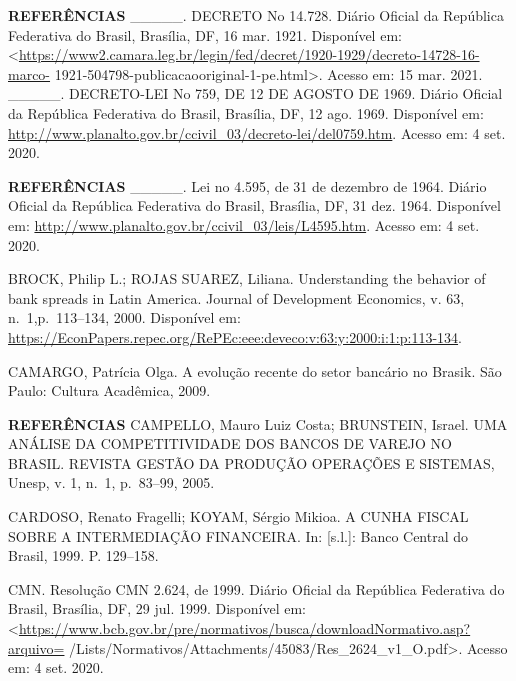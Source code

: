 \documentclass[
  ignorenonframetext,
  aspectratio=169,
  ignorenonframetext]{beamer}
\begin{document}
\begin{frame}{\textbf{REFERÊNCIAS}}
\protect\hypertarget{referuxeancias-6}{}
\_\_\_\_\_. DECRETO No 14.728. Diário Oficial da República Federativa do
Brasil, Brasília, DF, 16 mar. 1921. Disponível em:
\textless{}\url{https://www2.camara.leg.br/legin/fed/decret/1920-1929/decreto-14728-16-marco-}
1921-504798-publicacaooriginal-1-pe.html\textgreater. Acesso em: 15 mar.
2021. \_\_\_\_\_. DECRETO-LEI No 759, DE 12 DE AGOSTO DE 1969. Diário
Oficial da República Federativa do Brasil, Brasília, DF, 12 ago. 1969.
Disponível em:
\url{http://www.planalto.gov.br/ccivil_03/decreto-lei/del0759.htm}.
Acesso em: 4 set. 2020.
\end{frame}

\begin{frame}{\textbf{REFERÊNCIAS}}
\protect\hypertarget{referuxeancias-7}{}
\_\_\_\_\_. Lei no 4.595, de 31 de dezembro de 1964. Diário Oficial da
República Federativa do Brasil, Brasília, DF, 31 dez. 1964. Disponível
em: \url{http://www.planalto.gov.br/ccivil_03/leis/L4595.htm}. Acesso
em: 4 set. 2020.

BROCK, Philip L.; ROJAS SUAREZ, Liliana. Understanding the behavior of
bank spreads in Latin America. Journal of Development Economics, v. 63,
n.~1,p.~113--134, 2000. Disponível em:
\url{https://EconPapers.repec.org/RePEc:eee:deveco:v:63:y:2000:i:1:p:113-134}.

CAMARGO, Patrícia Olga. A evolução recente do setor bancário no Brasik.
São Paulo: Cultura Acadêmica, 2009.
\end{frame}

\begin{frame}{\textbf{REFERÊNCIAS}}
\protect\hypertarget{referuxeancias-8}{}
CAMPELLO, Mauro Luiz Costa; BRUNSTEIN, Israel. UMA ANÁLISE DA
COMPETITIVIDADE DOS BANCOS DE VAREJO NO BRASIL. REVISTA GESTÃO DA
PRODUÇÃO OPERAÇÕES E SISTEMAS, Unesp, v. 1, n.~1, p.~83--99, 2005.

CARDOSO, Renato Fragelli; KOYAM, Sérgio Mikioa. A CUNHA FISCAL SOBRE A
INTERMEDIAÇÃO FINANCEIRA. In: {[}s.l.{]}: Banco Central do Brasil, 1999.
P. 129--158.

CMN. Resolução CMN 2.624, de 1999. Diário Oficial da República
Federativa do Brasil, Brasília, DF, 29 jul. 1999. Disponível em:
\textless{}\url{https://www.bcb.gov.br/pre/normativos/busca/downloadNormativo.asp?arquivo=}
/Lists/Normativos/Attachments/45083/Res\_2624\_v1\_O.pdf\textgreater.
Acesso em: 4 set. 2020.
\end{frame}
\end{document}
